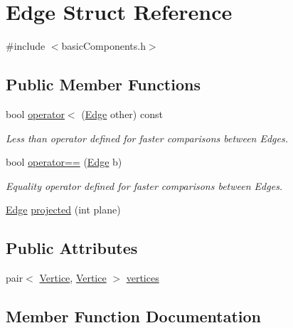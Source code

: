 \hypertarget{structEdge}{}\section{Edge Struct Reference}
\label{structEdge}


{\ttfamily \#include $<$basic\+Components.\+h$>$}

\subsection*{Public Member Functions}
\begin{DoxyCompactItemize}
\item 
bool \hyperlink{structEdge_acee00bfc0d6c9201c6def4c5c2b35058}{operator$<$} (\hyperlink{structEdge}{Edge} other) const
\begin{DoxyCompactList}\small\item\em Less than operator defined for faster comparisons between Edges. \end{DoxyCompactList}\item 
bool \hyperlink{structEdge_ad7b8ac3b7836a7258252d348caf3d2a9}{operator==} (\hyperlink{structEdge}{Edge} b)
\begin{DoxyCompactList}\small\item\em Equality operator defined for faster comparisons between Edges. \end{DoxyCompactList}\item 
\hyperlink{structEdge}{Edge} \hyperlink{structEdge_ad630958e9d2d4c3bcdd5fc74477ce842}{projected} (int plane)
\end{DoxyCompactItemize}
\subsection*{Public Attributes}
\begin{DoxyCompactItemize}
\item 
pair$<$ \hyperlink{structVertice}{Vertice}, \hyperlink{structVertice}{Vertice} $>$ \hyperlink{structEdge_adb182142702f93f85a3f41c86f4916ff}{vertices}
\end{DoxyCompactItemize}


\subsection{Member Function Documentation}
\mbox{\label{structEdge_acee00bfc0d6c9201c6def4c5c2b35058}} 
